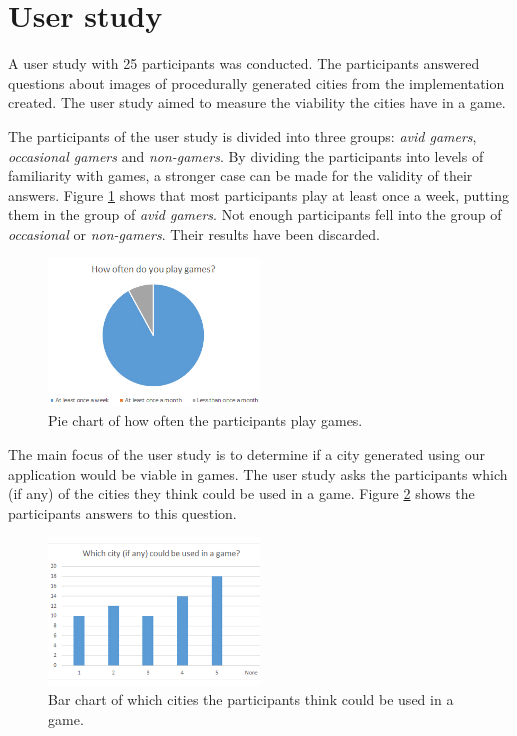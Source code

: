 \section{User study}
	A user study with 25 participants was conducted. The participants answered questions about images of procedurally generated cities from the implementation created. The user study aimed to measure the viability the cities have in a game.
	
	\par
	The participants of the user study is divided into three groups: \textit{avid gamers}, \textit{occasional gamers} and \textit{non-gamers}. By dividing the participants into levels of familiarity with games, a stronger case can be made for the validity of their answers. Figure \ref{fig:pie-chart-often-play} shows that most participants play at least once a week, putting them in the group of \textit{avid gamers}. Not enough participants fell into the group of \textit{occasional} or \textit{non-gamers}. Their results have been discarded.
	
	\begin{figure}[h]
		\centering
		\includegraphics[width=0.5\textwidth]{"Images/OftenPlay"}
		\caption{Pie chart of how often the participants play games.}
		\label{fig:pie-chart-often-play}
	\end{figure}
	
	The main focus of the user study is to determine if a city generated using our application would be viable in games. The user study asks the participants which (if any) of the cities they think could be used in a game. Figure \ref{fig:pie-chart-use-in-game} shows the participants answers to this question.
	
	\begin{figure}[h]
		\centering
		\includegraphics[width=0.5\textwidth]{"Images/UseInGame"}
		\caption{Bar chart of which cities the participants think could be used in a game.}
		\label{fig:pie-chart-use-in-game}
	\end{figure}
	
